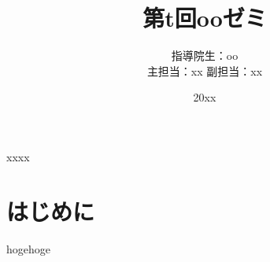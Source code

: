 \documentclass[a4paper,10pt]{jsarticle}
\begin{document}


\title{第t回ooゼミ}

\author{指導院生：oo \\主担当：xx 副担当：xx}
%
\date{20xx}{xx}{xx}
%
\begin{abstract}
\end{abstract}
%
\endheader
%
\section{はじめに}
hogehoge




\end{document}
